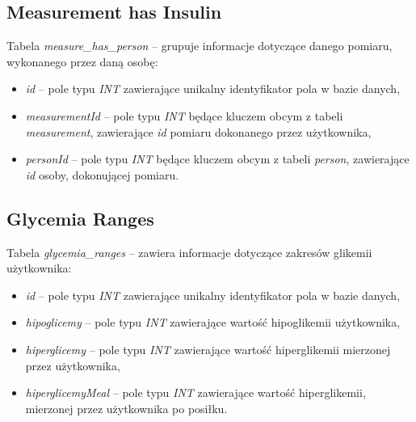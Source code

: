 \subsection{Measurement has Insulin}
Tabela \textit{measure\_has\_person} -- grupuje informacje dotyczące danego pomiaru, wykonanego przez daną osobę: 
\begin{itemize}
	\item \textit{id} -- pole typu \textit{INT} zawierające unikalny identyfikator pola w bazie danych,
	\item \textit{measurementId} -- pole typu \textit{INT} będące kluczem obcym z tabeli \textit{measurement}, zawierające \textit{id} pomiaru dokonanego przez użytkownika,
	\item \textit{personId} -- pole typu \textit{INT} będące kluczem obcym z tabeli \textit{person}, zawierające \textit{id} osoby, dokonującej pomiaru.
\end{itemize}

\subsection{Glycemia Ranges}
Tabela \textit{glycemia\_ranges} -- zawiera informacje dotyczące zakresów glikemii użytkownika:
\begin{itemize}
	\item \textit{id} -- pole typu \textit{INT} zawierające unikalny identyfikator pola w bazie danych,
	\item \textit{hipoglicemy} -- pole typu \textit{INT} zawierające wartość hipoglikemii użytkownika,
	\item \textit{hiperglicemy} -- pole typu \textit{INT} zawierające wartość hiperglikemii mierzonej przez użytkownika,
	\item \textit{hiperglicemyMeal} -- pole typu \textit{INT} zawierające wartość hiperglikemii, mierzonej przez użytkownika po posiłku.
\end{itemize}

